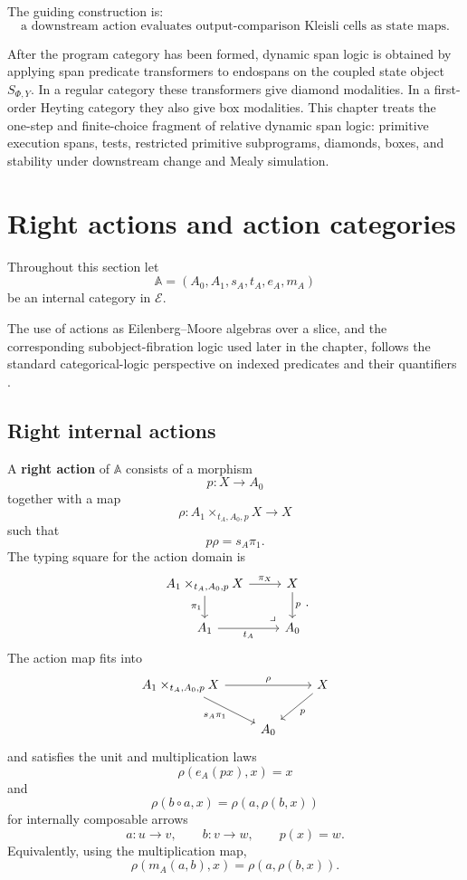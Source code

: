 The guiding construction is:
\[
\boxed{
\text{a downstream action evaluates output-comparison Kleisli cells as
state maps.}
}
\]

After the program category has been formed, dynamic span logic is obtained by
applying span predicate transformers to endospans on the coupled state object
\(S_{\Phi,Y}\). In a regular category these transformers give diamond
modalities. In a first-order Heyting category they also give box modalities.
This chapter treats the one-step and finite-choice fragment of relative
dynamic span logic: primitive execution spans, tests, restricted primitive
subprograms, diamonds, boxes, and stability under downstream change and Mealy
simulation.

\section{Right actions and action categories}
\label{sec:relative-right-actions-action-categories}

Throughout this section let
\[
\mathbb A=(A_0,A_1,s_A,t_A,e_A,m_A)
\]
be an internal category in \(\mathcal E\).

The use of actions as Eilenberg--Moore algebras over a slice, and the
corresponding subobject-fibration logic used later in the chapter, follows the
standard categorical-logic perspective on indexed predicates and their
quantifiers \cite{Jacobs1999CategoricalLogic}.

\subsection{Right internal actions}
\label{subsec:relative-right-actions}

\begin{definition}
\label{def:relative-right-action}
A \textbf{right action} of \(\mathbb A\) consists of a morphism
\[
p:X\to A_0
\]
together with a map
\[
\rho:
A_1\times_{t_A,A_0,p}X\to X
\]
such that
\[
p\rho=s_A\pi_1.
\]
The typing square for the action domain is
\[
\begin{tikzcd}
A_1\times_{t_A,A_0,p}X
\arrow[r,"\pi_X"]
\arrow[d,"\pi_1"']
&
X
\arrow[d,"p"]
\\
A_1
\arrow[r,"t_A"']
&
A_0
\arrow[ul,phantom,very near start,"\lrcorner"]
\end{tikzcd}
.
\]
The action map fits into
\[
\begin{tikzcd}
A_1\times_{t_A,A_0,p}X
\arrow[rr,"\rho"]
\arrow[dr,"s_A\pi_1"']
&&
X
\arrow[dl,"p"]
\\
& A_0 &
\end{tikzcd}
\]
and satisfies the unit and multiplication laws
\[
\rho(e_A(px),x)=x
\]
and
\[
\rho(b\circ a,x)=\rho(a,\rho(b,x))
\]
for internally composable arrows
\[
a:u\to v,
\qquad
b:v\to w,
\qquad
p(x)=w.
\]
Equivalently, using the multiplication map,
\[
\rho(m_A(a,b),x)=\rho(a,\rho(b,x)).
\]
\end{definition}

